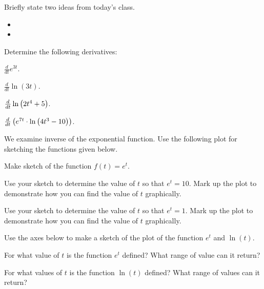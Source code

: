 \begin{problem}
\end{problem}

\postClass

\begin{problem}
\item Briefly state two ideas from today's class.
  \begin{itemize}
  \item
  \item
  \end{itemize}
\item Determine the following derivatives:
  \begin{subproblem}
    \item $\frac{d}{dt} e^{3t}$.
      \vfill
    \item $\frac{d}{dt} \ln(3t)$.
      \vfill
    \item $\frac{d}{dt} \ln\left( 2t^4 + 5\right)$.
      \vfill
    \item $\frac{d}{dt} \left( e^{7t} \cdot \ln \left( 4t^3 - 10\right) \right)$.
      \vfill
  \end{subproblem}

\clearpage

\item We examine inverse of the exponential function. Use the
  following plot for sketching the functions given below.

  \scalebox{0.75}{}

  \begin{subproblem}
  \item Make sketch of the function $f(t) = e^t$.
  \item Use your sketch to determine the value of $t$ so that
    $e^t=10$. Mark up the plot to demonstrate how you can find the
    value of $t$ graphically.
  \item Use your sketch to determine the value of $t$ so that
    $e^t=1$. Mark up the plot to demonstrate how you can find the
    value of $t$ graphically.
  \end{subproblem}

\item Use the axes below to make a sketch of the plot of the function
  $e^t$ and $\ln(t)$.

  \scalebox{0.75}{}


\item For what value of $t$ is the function $e^t$ defined? What range
  of value can it return?

\item For what values of $t$ is the function $\ln(t)$ defined? What
  range of values can it return?



\end{problem}

